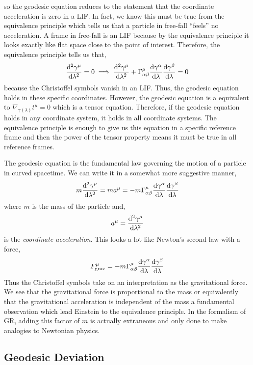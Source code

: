 \documentclass[11pt, a4paper]{article}
\begin{document}
so the geodesic equation reduces to the statement that the coordinate acceleration is zero in a LIF. In fact, we know this must be true from the equivalence principle which tells us that a particle in free-fall ``feels'' no acceleration. A frame in free-fall is an LIF because by the equivalence principle it looks exactly like flat space close to the point of interest. Therefore, 
the equivalence principle tells us that,
\[  \frac{\mathrm{d}^{2} \gamma^\mu}{\mathrm{d}\lambda^{2}} = 0 \implies \frac{\mathrm{d}^{2} \gamma^\mu}{\mathrm{d}\lambda^{2}} + \Gamma^{\mu}_{\alpha \beta} \frac{\mathrm{d}\gamma^\alpha}{\mathrm{d}\lambda} \frac{\mathrm{d}\gamma^\beta}{\mathrm{d}\lambda}  = 0\]
because the Christoffel symbols vanish in an LIF. Thus, the geodesic equation holds in these specific coordinates. However, the geodesic equation is a equivalent to $\nabla_{\gamma(\lambda)} t^\mu = 0$ which is a tensor equation. Therefore, if the geodesic equation holds in any coordinate system, it holds in all coordinate systems. The equivalence principle is enough to give us this equation in a specific reference frame and then the power of the tensor property means it must be true in all reference frames. 
\par
The geodesic equation is the fundamental law governing the motion of a particle in curved spacetime. We can write it in a somewhat more suggestive manner,
\[  m \frac{\mathrm{d}^{2} \gamma^\mu}{\mathrm{d}\lambda^{2}} = m a^{\mu} = - m \Gamma^{\mu}_{\alpha \beta} \frac{\mathrm{d}\gamma^\alpha}{\mathrm{d}\lambda} \frac{\mathrm{d}\gamma^\beta}{\mathrm{d}\lambda} \] 
where $m$ is the mass of the particle and,
\[ a^\mu = \frac{\mathrm{d}^{2} \gamma^\mu}{\mathrm{d}\lambda^{2}} \]
is the \textit{coordinate acceleration}. This looks a lot like Newton's second law with a force,
\[ F^{\mu}_{\mathrm{grav}} = - m \Gamma^{\mu}_{\alpha \beta} \frac{\mathrm{d}\gamma^\alpha}{\mathrm{d}\lambda} \frac{\mathrm{d}\gamma^\beta}{\mathrm{d}\lambda}\]
Thus the Christoffel symbols take on an interpretation as the gravitational force. 
We see that the gravitational force is proportional to the mass or equivalently that the gravitational acceleration is independent of the mass a fundamental observation which lead Einstein to the equivalence principle. In the formalism of GR, adding this factor of $m$ is actually extraneous and only done to make analogies to Newtonian physics.   

\subsection{Geodesic Deviation}
\end{document}
